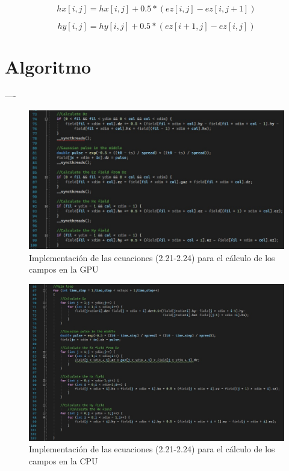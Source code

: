 \documentclass[11pt,a4paper,twoside,pdf]{article}
\numberwithin{equation}{section}
\begin{document}
\begin{equation}
    hx[i,j]=hx[i,j]+0.5*(ez[i,j]-ez[i,j+1])
\end{equation}

\begin{equation}
    hy[i,j]=hy[i,j]+0.5*(ez[i+1,j]-ez[i,j])
\end{equation}

\newpage


\section{Algoritmo}
----

\begin{figure}[h]
\centering
\includegraphics[width=15cm]{FD2D_Kernel_loop.jpg}				
\caption{Implementación de las ecuaciones (2.21-2.24) para el cálculo de los campos en la GPU }
\end{figure}
\noindent

\begin{figure}[h]
\centering
\includegraphics[width=15cm]{FD2D_Host_loop.jpg}				
\caption{Implementación de las ecuaciones (2.21-2.24) para el cálculo de los campos en la CPU }
\end{figure}
\noindent
\end{document}

